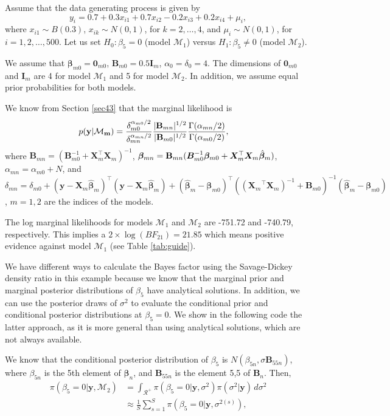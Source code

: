 Assume that the data generating process is given by  
\[
y_{i} = 0.7 + 0.3x_{i1} + 0.7x_{i2} - 0.2x_{i3} + 0.2x_{i4} + \mu_i,
\]
where \(x_{i1} \sim B(0.3)\), \(x_{ik} \sim N(0,1)\), for \(k = 2, \dots, 4\), and \(\mu_i \sim N(0, 1)\), for \(i = 1, 2, \dots, 500\). Let us set \(H_0: \beta_5 = 0\) (model \(\mathcal{M}_1\)) versus \(H_1: \beta_5 \neq 0\) (model \(\mathcal{M}_2\)).

We assume that \(\bm{\beta}_{m0} = \bm{0}_{m0}\), \(\bm{B}_{m0} = 0.5 \bm{I}_{m}\), \(\alpha_0 = \delta_0 = 4\). The dimensions of \(\bm{0}_{m0}\) and \(\bm{I}_m\) are 4 for model \(\mathcal{M}_1\) and 5 for model \(\mathcal{M}_2\). In addition, we assume equal prior probabilities for both models.

We know from Section \ref{sec43} that the marginal likelihood is
\begin{align*}
	p(\bf{y}|\mathcal{M}_m)&=\frac{\delta_{m0}^{\alpha_{m0}/2}}{\delta_{mn}^{\alpha_{mn}/2}}\frac{|{\bf{B}}_{mn}|^{1/2}}{|{\bf{B}}_{m0}|^{1/2}}\frac{\Gamma(\alpha_{mn}/2)}{\Gamma(\alpha_{m0}/2)},
\end{align*}
where  ${{\bm{B}}}_{mn} = ({\bm{B}}_{m0}^{-1} + {\bm{X}}_m^{\top}{\bm{X}}_m)^{-1}$, $\bm{\beta}_{mn} = {{\bf{B}}}_{mn}({\bm{B}}_{m0}^{-1}\bm{\beta}_{m0} + {\bm{X}}_m^{\top}{\bm{X}}_m\hat{\bm{\beta}}_m)$, $\alpha_{mn}=\alpha_{m0}+N$, and $\delta_{mn}=\delta_{m0}+({\bm{y}}-{\bm{X}}_m\hat{\bm{\beta}}_m)^{\top}({\bm{y}}-{\bm{X}}_m\hat{\bm{\beta}}_m)+(\hat{\bm{\beta}}_m-\bm{\beta}_{m0})^{\top}(({\bm{X}_m}^{\top}{\bm{X}_m})^{-1}+{\bm{B}}_{m0})^{-1}(\hat{\bm{\beta}}_m-\bm{\beta}_{m0})$, $m=1,2$ are the indices of the models.

The log marginal likelihoods for models $\mathcal{M}_1$ and $\mathcal{M}_2$ are -751.72 and -740.79, respectively. This implies a $2\times\log(BF_{21})=21.85$ which means positive evidence against model $\mathcal{M}_1$ (see Table \ref{tab:guide}).

We have different ways to calculate the Bayes factor using the Savage-Dickey density ratio in this example because we know that the marginal prior and marginal posterior distributions of $\beta_5$ have analytical solutions. In addition, we can use the posterior draws of $\sigma^2$ to evaluate the conditional prior and conditional posterior distributions at $\beta_5=0$. We show in the following code the latter approach, as it is more general than using analytical solutions, which are not always available.

We know that the conditional posterior distribution of $\beta_5$ is $N(\beta_{5n}, \sigma \bm{B}_{55n})$, where $\beta_{5n}$ is the 5th element of $\bm{\beta}_n$, and $\bm{B}_{55n}$ is the element 5,5 of $\bm{B}_n$. Then,
\begin{align*}
	\pi(\beta_5=0|\bm{y}, \mathcal{M}_2) &= \int_{\mathcal{R}^+} \pi(\beta_5=0|\bm{y}, \sigma^2) \pi(\sigma^2|\bm{y}) \, d\sigma^2 \\
	&\approx \frac{1}{S} \sum_{s=1}^S \pi(\beta_5=0|\bm{y}, \sigma^{2(s)}),
\end{align*}

